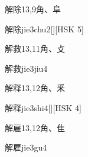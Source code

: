 \begin{Entry}{解除}{13,9}{⾓、⾩}
  \begin{Phonetics}{解除}{jie3chu2}[][HSK 5]
  \end{Phonetics}
\end{Entry}

\begin{Entry}{解救}{13,11}{⾓、⽁}
  \begin{Phonetics}{解救}{jie3jiu4}
  \end{Phonetics}
\end{Entry}

\begin{Entry}{解释}{13,12}{⾓、⾤}
  \begin{Phonetics}{解释}{jie3shi4}[][HSK 4]
  \end{Phonetics}
\end{Entry}

\begin{Entry}{解雇}{13,12}{⾓、⾫}
  \begin{Phonetics}{解雇}{jie3gu4}
  \end{Phonetics}
\end{Entry}


